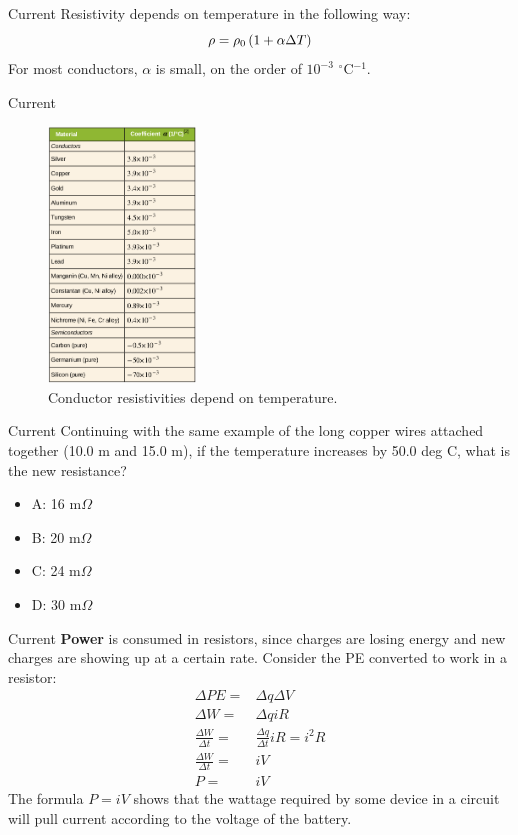 \documentclass{beamer}
\begin{document}
\begin{frame}{Current}
Resistivity depends on temperature in the following way:
\begin{equation}
\rho = \rho_{\rm 0} \left(1 + \alpha \Delta T\right)
\end{equation}
For most conductors, $\alpha$ is small, on the order of $10^{-3}$ $^\circ$C$^{-1}$.
\end{frame}

\begin{frame}{Current}
\begin{figure}
\centering
\includegraphics[width=0.35\textwidth]{figures/rho3.png}
\caption{\label{fig:rho3} Conductor resistivities depend on temperature.}
\end{figure}
\end{frame}

\begin{frame}{Current}
Continuing with the same example of the long copper wires attached together (10.0 m and 15.0 m), if the temperature increases by 50.0 deg C, what is the new resistance?
\begin{itemize}
\item A: 16 m$\Omega$
\item B: 20 m$\Omega$
\item C: 24 m$\Omega$
\item D: 30 m$\Omega$
\end{itemize}
\end{frame}

\begin{frame}{Current}
\textbf{Power} is consumed in resistors, since charges are losing energy and new charges are showing up at a certain rate.  Consider the PE converted to work in a resistor:
\begin{align}
\Delta PE =& \Delta q\Delta V \\
\Delta W =& \Delta q i R \\
\frac{\Delta W}{\Delta t} =& \frac{\Delta q}{\Delta t} i R = i^2 R \\
\frac{\Delta W}{\Delta t} =& i V \\
P =& iV
\end{align}
The formula $P = iV$ shows that the wattage required by some device in a circuit will pull current according to the voltage of the battery.
\end{frame}
\end{document}
